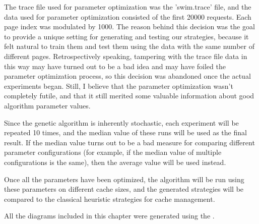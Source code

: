 The trace file used for parameter optimization was the 'swim.trace' file, and the data used for parameter optimization consisted of the first 20000 requests. Each page index was modulated by 1000. The reason behind this decision was the goal to provide a unique setting for generating and testing our strategies, because it felt natural to train them and test them using the data with the same number of different pages. Retrospectively speaking, tampering with the trace file data in this way may have turned out to be a bad idea and may have foiled the parameter optimization process, so this decision was abandoned once the actual experiments began. Still, I believe that the parameter optimization wasn't completely futile, and that it still merited some valuable information about good algorithm parameter values.

Since the genetic algorithm is inherently stochastic, each experiment will be repeated 10 times, and the median value of these runs will be used as the final result. If the median value turns out to be a bad measure for comparing different parameter configurations (for example, if the median value of multiple configurations is the same), then the average value will be used instead.

Once all the parameters have been optimized, the algorithm will be run using these parameters on different cache sizes, and the generated strategies will be compared to the classical heuristic strategies for cache management.

All the diagrams included in this chapter were generated using the \citep{box_plots}.